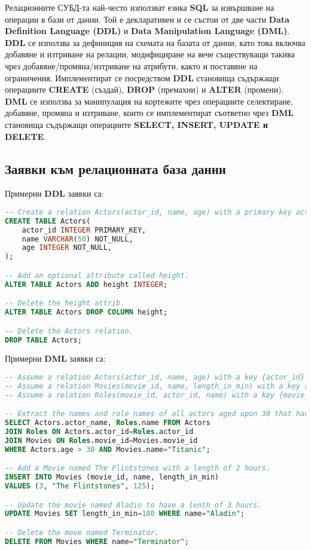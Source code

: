 \documentclass[fleqn,12pt]{article}
\begin{document}
Релационните СУБД-та най-често използват езика \textbf{SQL} за извършване на операции в бази от данни.
Той е декларативен и се състои от две части \textbf{Data Definition Language (DDL)} и \textbf{Data Manipulation Language (DML)}.
\bigbreak
\textbf{DDL} се използва за дефиниция на схемата на базата от данни, като това включва добавяне и изтриване на релации, модифициране на вече съществуващи такива чрез добавяне/промяна/изтриване на атрибути, както и поставяне на ограничения.
Имплементират се посредством \textbf{DDL} становища съдържащи операциите \textbf{CREATE} (създай), \textbf{DROP} (премахни) и \textbf{ALTER} (промени).
\bigbreak
\textbf{DML} се използва за манипулация на кортежите чрез операциите селектиране, добавяне, промяна и изтриване, които се имплементират съответно чрез \textbf{DML} становища съдържащи операциите \textbf{SELECT, INSERT, UPDATE и DELETE}.

\subsection{Заявки към релационната база данни}

\bigbreak
Примерни \textbf{DDL} заявки са:

\begin{lstlisting}[language=SQL, caption=DLL queries example]
-- Create a relation Actors(actor_id, name, age) with a primary key actor_id.
CREATE TABLE Actors(
    actor_id INTEGER PRIMARY_KEY,
    name VARCHAR(50) NOT_NULL,
    age INTEGER NOT_NULL,
);

-- Add an optional attribute called height.
ALTER TABLE Actors ADD height INTEGER;

-- Delete the height attrib.
ALTER TABLE Actors DROP COLUMN height;

-- Delete the Actors relation.
DROP TABLE Actors;
\end{lstlisting}


Примерни \textbf{DML} заявки са:

\begin{lstlisting}[language=SQL, caption=DML queries example]
-- Assume a relation Actors(actor_id, name, age) with a key {actor_id}
-- Assume a relation Movies(movie_id, name, length_in_min) with a key {movie_id}
-- Assume a relation Roles(movie_id, actor_id, name) with a key {movie_id, actor_id}

-- Extract the names and role names of all actors aged upon 30 that have participated in Titanic.
SELECT Actors.actor_name, Roles.name FROM Actors
JOIN Roles ON Actors.actor_id=Roles.actor_id
JOIN Movies ON Roles.movie_id=Movies.movie_id
WHERE Actors.age > 30 AND Movies.name="Titanic";

-- Add a Movie named The Flintstones with a length of 2 hours.
INSERT INTO Movies (movie_id, name, length_in_min)
VALUES (3, "The Flintstones", 125);

-- Update the movie named Aladin to have a lenth of 3 hours.
UPDATE Movies SET length_in_min=180 WHERE name="Aladin";

-- Delete the move named Terminator.
DELETE FROM Movies WHERE name="Terminator";
\end{lstlisting}
\end{document}
